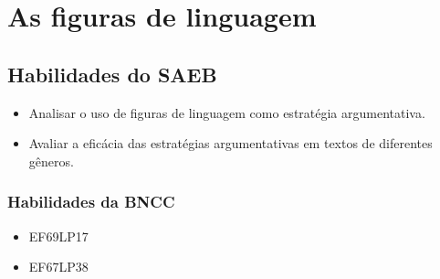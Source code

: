 
\chapter{As figuras de linguagem}

\section*{Habilidades do SAEB}
\begin{itemize}
\item Analisar o uso de figuras de linguagem como
estratégia argumentativa.
\item Avaliar a eficácia das estratégias
argumentativas em textos de diferentes gêneros.
\end{itemize}

\subsection*{Habilidades da BNCC} 
\begin{itemize}
\item EF69LP17
\item EF67LP38
\end{itemize}

